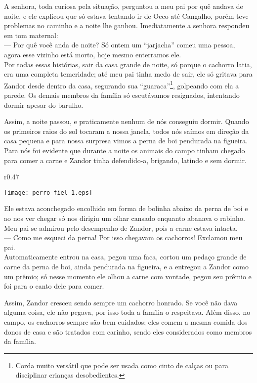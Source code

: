 A senhora, toda curiosa pela situação, perguntou a meu pai por quê andava de noite, e ele explicou que só estava tentando ir de Occo até Cangalho, porém teve problemas no caminho e a noite lhe ganhou. Imediatamente a senhora respondeu em tom maternal:\\\indent 
--- Por quê você anda de noite? Só ontem um ``jarjacha'' comeu uma pessoa, agora esse vizinho está morto, hoje mesmo enterramos ele.\\\indent
Por todas essas histórias, sair da casa grande de noite, só porque o cachorro latia, era uma completa temeridade; até meu pai tinha medo de sair, ele só gritava para Zandor desde dentro da casa, segurando sua ``guaraca''\footnote{Corda muito versátil que pode ser usada como cinto de calças ou para disciplinar crianças desobedientes.}, golpeando com ela a parede. 
Os demais membros da família só escutávamos resignados, intentando dormir apesar do barulho.

Assim, a noite passou, e praticamente nenhum de nós conseguiu dormir. Quando os primeiros raios do sol tocaram a nossa janela, todos nós saímos em direção da casa pequena e para nossa surpresa vimos a perna de boi pendurada na figueira. Para nós foi evidente que durante a noite os animais do campo tinham chegado para comer a carne e Zandor tinha defendido-a, brigando, latindo e sem dormir.
\ifdefined\EnableIncludeImages 
\begin{wrapfigure}{r}{0.47\textwidth}
  \begin{center}
  \vspace{-0.5cm}
    \texttt{[image: perro-fiel-1.eps]}
  \end{center}
  \vspace{-0.5cm}
\end{wrapfigure}
\fi
Ele estava aconchegado encolhido em forma de bolinha abaixo da perna de boi e ao nos ver chegar só nos dirigiu um olhar cansado enquanto abanava o rabinho. Meu pai se admirou pelo desempenho de Zandor, pois a carne estava intacta.\\\indent
--- Como me esqueci da perna! Por isso chegavam os cachorros! Exclamou meu pai.\\\indent
Automaticamente entrou na casa, pegou uma faca, cortou um pedaço grande de carne da perna de boi, ainda pendurada na figueira, e a entregou a Zandor como um prêmio; só nesse momento ele olhou a carne com vontade, pegou seu prêmio e foi para o canto dele para comer.

Assim, Zandor cresceu sendo sempre um cachorro honrado. Se você não dava alguma coisa, ele não pegava, por isso toda a família o respeitava. Além disso, no campo, os cachorros sempre são bem cuidados; eles comem a mesma comida dos donos de casa e são tratados com carinho, sendo eles considerados como membros da família.

